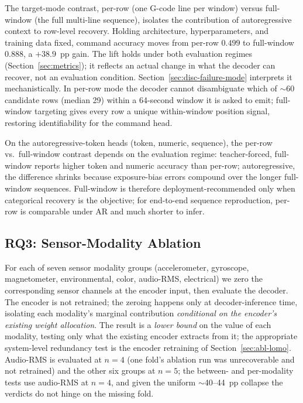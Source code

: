 \documentclass[sensors,article,submit,moreauthors,pdftex]{Definitions/mdpi}
\begin{document}
The target-mode contrast, per-row (one G-code line per window) versus full-window (the full multi-line sequence), isolates the contribution of autoregressive context to row-level recovery. Holding architecture, hyperparameters, and training data fixed, command accuracy moves from per-row $0.499$ to full-window $0.888$, a $+38.9$~pp gain. The lift holds under both evaluation regimes (Section~\ref{sec:metrics}); it reflects an actual change in what the decoder can recover, not an evaluation condition. Section~\ref{sec:disc-failure-mode} interprets it mechanistically. In per-row mode the decoder cannot disambiguate which of $\sim$60 candidate rows (median 29) within a 64-second window it is asked to emit; full-window targeting gives every row a unique within-window position signal, restoring identifiability for the command head.

On the autoregressive-token heads (token, numeric, sequence), the per-row vs.\ full-window contrast depends on the evaluation regime: teacher-forced, full-window reports higher token and numeric accuracy than per-row; autoregressive, the difference shrinks because exposure-bias errors compound over the longer full-window sequences. Full-window is therefore deployment-recommended only when categorical recovery is the objective; for end-to-end sequence reproduction, per-row is comparable under AR and much shorter to infer.

\subsection{RQ3: Sensor-Modality Ablation}
\label{sec:abl-sensors}

For each of seven sensor modality groups (accelerometer, gyroscope, magnetometer, environmental, color, audio-RMS, electrical) we zero the corresponding sensor channels at the encoder input, then evaluate the decoder. The encoder is not retrained; the zeroing happens only at decoder-inference time, isolating each modality's marginal contribution \emph{conditional on the encoder's existing weight allocation}. The result is a \emph{lower bound} on the value of each modality, testing only what the existing encoder extracts from it; the appropriate system-level redundancy test is the encoder retraining of Section~\ref{sec:abl-lomo}. Audio-RMS is evaluated at $n=4$ (one fold's ablation run was unrecoverable and not retrained) and the other six groups at $n=5$; the between- and per-modality tests use audio-RMS at $n=4$, and given the uniform $\sim$40--44~pp collapse the verdicts do not hinge on the missing fold.
\end{document}
